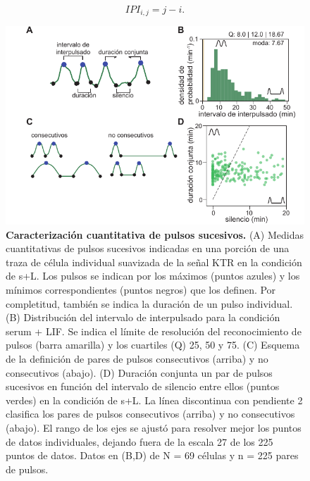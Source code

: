 \documentclass[./main.tex]{subfiles}
\begin{document}
\begin{equation}
    IPI_{i,j} = j-i.
    \label{C2_eq:IPI}
\end{equation}

 \begin{figure}
    \centering
    \includegraphics[width=1\columnwidth]{figures/chapter2/C2_IPI_consec.pdf}\caption{\textbf{Caracterización cuantitativa de pulsos sucesivos.} (A) Medidas cuantitativas de pulsos sucesivos indicadas en una porción de una traza de célula individual suavizada de la señal KTR en la condición de s+L. Los pulsos se indican por los máximos (puntos azules) y los mínimos correspondientes (puntos negros) que los definen. Por completitud, también se indica la duración de un pulso individual. (B) Distribución del intervalo de interpulsado para la condición serum + LIF. Se indica el límite de resolución del reconocimiento de pulsos (barra amarilla) y los cuartiles (Q) 25, 50 y 75. (C) Esquema de la definición de pares de pulsos consecutivos (arriba) y no consecutivos (abajo). (D) Duración conjunta un par de pulsos sucesivos en función del intervalo de silencio entre ellos (puntos verdes) en la condición de s+L. La línea discontinua con pendiente 2 clasifica los pares de pulsos consecutivos (arriba) y no consecutivos (abajo). El rango de los ejes se ajustó para resolver mejor los puntos de datos individuales, dejando fuera de la escala 27 de los 225 puntos de datos. Datos en (B,D) de N = 69 células y n = 225 pares de pulsos. }
    \label{C2_fig:analisis_pulsos_sucesivos}
\end{figure}
\end{document}
